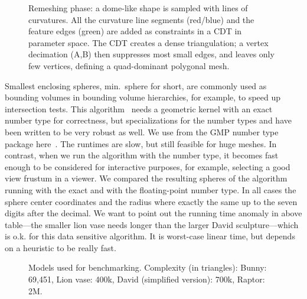 \begin{figure}
  \centering
  \caption{Remeshing phase: a dome-like shape is sampled with lines of
  curvatures. All the curvature line segments (red/blue) and the
  feature edges (green) are added as constraints in a CDT in parameter
  space. The CDT creates a dense triangulation; a vertex
  decimation (A,B) then suppresses most small edges, and leaves only
  few vertices, defining a quad-dominant polygonal mesh.}
  \label{fig:trimming}\vspace{-3mm}
\end{figure}


Smallest enclosing spheres, min.~sphere for short, are commonly used
as bounding volumes in bounding volume hierarchies, for example, to
speed up intersection tests. This algorithm~\cite{fg-sebbc-03} needs a
geometric kernel with an exact number type for correctness, but
specializations for the number types  and
 have been written to be very robust as well. We use
 from the GMP number type package
here~\cite{cgal:g-gmpal-96}. The runtimes are slow, but still feasible
for huge meshes. In contrast, when we run the algorithm with the
 number type, it becomes fast enough to be considered
for interactive purposes, for example, selecting a good view frustum
in a viewer. We compared the resulting spheres of the algorithm
running with the exact and with the floating-point number type. In all
cases the sphere center coordinates and the radius where exactly the
same up to the seven digits after the decimal. We want to point out
the running time anomaly in above table---the smaller lion vase needs
longer than the larger David sculpture---which is o.k. for this data
sensitive algorithm. It is worst-case linear time, but depends on a
heuristic to be really fast.


\begin{figure}
  \centering
  \caption{Models used for benchmarking. 
           Complexity (in triangles):
           Bunny: 69,451,
           Lion vase: 400k,
           David (simplified version): 700k,
           Raptor: 2M.}
  \label{fig:models}\vspace{-3mm}
\end{figure}




